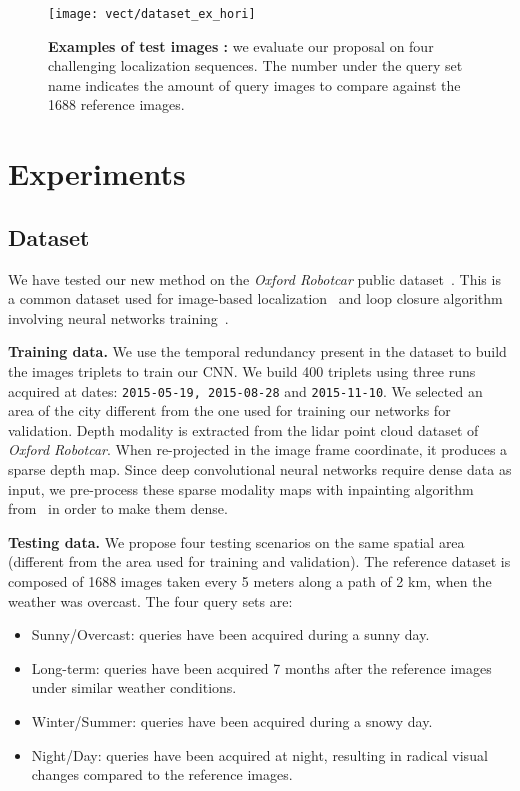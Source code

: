 \begin{figure}
	\center
	\texttt{[image: vect/dataset\_ex\_hori]}
	\caption{\label{fig:dataset} \textbf{Examples of test images :} we evaluate our proposal on four challenging localization sequences. The number under the query set name indicates the amount of query images to compare against the 1688 reference images.}
	\vspace{-0.25cm}
\end{figure}

\section{Experiments}
\label{sec:experiments}

\subsection{Dataset}
\label{subsec:dataset}
	We have tested our new method on the \textit{Oxford Robotcar} public dataset~\cite{Maddern2016}. This is a common dataset used for image-based localization~\cite{Sattler2018} and loop closure algorithm involving neural networks training~\cite{Porav2018}.
		
\vspace{4pt}\noindent\textbf{Training data.}
	We use the temporal redundancy present in the dataset to build the images triplets to train our CNN. We build 400 triplets using three runs acquired at dates: \texttt{2015-05-19, 2015-08-28} and \texttt{2015-11-10}. We selected an area of the city different from the one used for training our networks for validation.
	Depth modality is extracted from the lidar point cloud dataset of \textit{Oxford Robotcar}. When re-projected in the image frame coordinate, it produces a sparse depth map. Since deep convolutional neural networks require dense data as input, we pre-process these sparse modality maps with inpainting algorithm from~\cite{Bevilacqua2017} in order to make them dense.

\vspace{4pt}\noindent\textbf{Testing data.} We propose four testing scenarios on the same spatial area (different from the area used for training and validation). The reference dataset is composed of 1688 images taken every 5 meters along a path of 2 km, when the weather was overcast. The four query sets are:
\begin{itemize}
	\item {Sunny/Overcast:} queries have been acquired during a sunny day.
	\item {Long-term:} queries have been acquired 7 months after the reference images under similar weather conditions.
	\item {Winter/Summer:} queries have been acquired during a snowy day.
	\item {Night/Day:} queries have been acquired at night, resulting in radical visual changes compared to the reference images.
\end{itemize}

